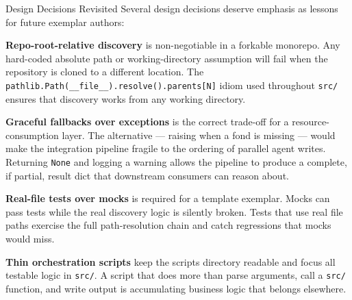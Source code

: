 \documentclass[
  ignorenonframetext,
]{beamer}
\begin{document}
\begin{frame}{Design Decisions Revisited}
\protect{}\label{design-decisions-revisited}
Several design decisions deserve emphasis as lessons for future exemplar
authors:

\textbf{Repo-root-relative discovery} is non-negotiable in a forkable
monorepo. Any hard-coded absolute path or working-directory assumption
will fail when the repository is cloned to a different location. The
\texttt{pathlib.Path(\_\_file\_\_).resolve().parents{[}N{]}} idiom used
throughout \texttt{src/} ensures that discovery works from any working
directory.

\textbf{Graceful fallbacks over exceptions} is the correct trade-off for
a resource-consumption layer. The alternative --- raising
 when a fond is missing --- would make the
integration pipeline fragile to the ordering of parallel agent writes.
Returning \texttt{None} and logging a warning allows the pipeline to
produce a complete, if partial, result dict that downstream consumers
can reason about.

\textbf{Real-file tests over mocks} is required for a template exemplar.
Mocks can pass tests while the real discovery logic is silently broken.
Tests that use real file paths exercise the full path-resolution chain
and catch regressions that mocks would miss.

\textbf{Thin orchestration scripts} keep the scripts directory readable
and focus all testable logic in \texttt{src/}. A script that does more
than parse arguments, call a \texttt{src/} function, and write output is
accumulating business logic that belongs elsewhere.
\end{frame}
\end{document}
